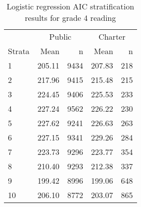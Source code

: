 \begin{table}[ht]
\centering
\caption{Logistic regression AIC stratification results for grade 4 reading} 
\label{g4read-circpsa10AIC}
\begin{tabular}{lrr@{\extracolsep{.2cm}}rr}
  \hline
   & \multicolumn{2}{c}{Public} & \multicolumn{2}{c}{Charter} \\ \cline{2-3} \cline{4-5} Strata & Mean & n & Mean & n \\ \hline
1 & 205.11 & 9434 & 207.83 & 218 \\ 
  2 & 217.96 & 9415 & 215.48 & 215 \\ 
  3 & 224.45 & 9406 & 225.53 & 233 \\ 
  4 & 227.24 & 9562 & 226.22 & 230 \\ 
  5 & 227.62 & 9241 & 226.63 & 263 \\ 
  6 & 227.15 & 9341 & 229.26 & 284 \\ 
  7 & 223.73 & 9296 & 223.77 & 354 \\ 
  8 & 210.40 & 9293 & 212.38 & 337 \\ 
  9 & 199.42 & 8996 & 199.06 & 648 \\ 
  10 & 206.10 & 8772 & 203.07 & 865 \\ 
   \hline
\end{tabular}
\end{table}
